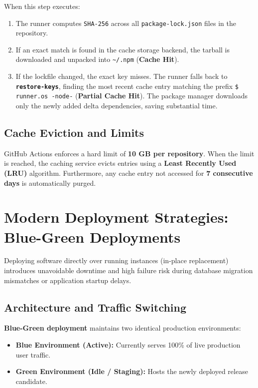 When this step executes:
\begin{enumerate}[leftmargin=15pt]
  \item The runner computes \texttt{SHA-256} across all \texttt{package-lock.json} files in the repository.
  \item If an exact match is found in the cache storage backend, the tarball is downloaded and unpacked into \texttt{\textasciitilde{}/.npm} (\textbf{Cache Hit}).
  \item If the lockfile changed, the exact key misses. The runner falls back to \textbf{\texttt{restore-keys}}, finding the most recent cache entry matching the prefix \texttt{\${{ runner.os }}-node-} (\textbf{Partial Cache Hit}). The package manager downloads only the newly added delta dependencies, saving substantial time.
\end{enumerate}

\subsection{Cache Eviction and Limits}
GitHub Actions enforces a hard limit of \textbf{10 GB per repository}. When the limit is reached, the caching service evicts entries using a \textbf{Least Recently Used (LRU)} algorithm. Furthermore, any cache entry not accessed for \textbf{7 consecutive days} is automatically purged.

\section{Modern Deployment Strategies: Blue-Green Deployments}

Deploying software directly over running instances (in-place replacement) introduces unavoidable downtime and high failure risk during database migration mismatches or application startup delays.

\subsection{Architecture and Traffic Switching}
\textbf{Blue-Green deployment} maintains two identical production environments:
\begin{itemize}[leftmargin=12pt]
  \item \textbf{Blue Environment (Active):} Currently serves 100\% of live production user traffic.
  \item \textbf{Green Environment (Idle / Staging):} Hosts the newly deployed release candidate.
\end{itemize}

